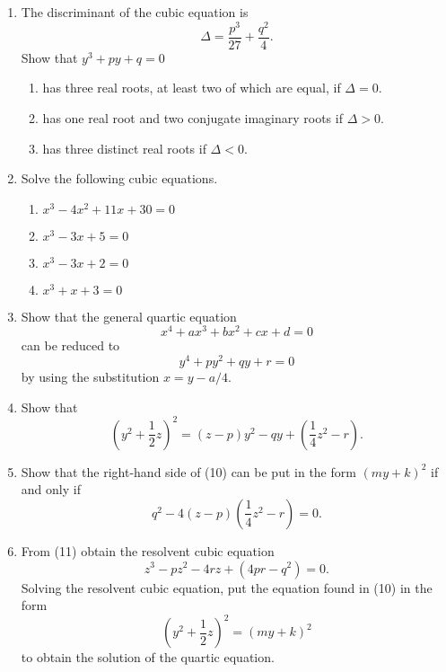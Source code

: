 {\begin{enumerate}
\item
The {\bfi discriminant\/} of the cubic equation is  
$$
\Delta = \frac{p^3}{27}  + \frac{q^2}{4}.
$$
Show that $y^3 + py + q=0$ 
\begin{enumerate}
 
\item
has three real roots, at least two of which are equal, if $\Delta = 0$.
 
\item
has one real root and two conjugate imaginary roots if $\Delta > 0$.
 
\item
has three distinct real roots if $\Delta < 0$.
 
\end{enumerate}

\item
Solve the following cubic equations.
\begin{multicols}{2}
\begin{enumerate}

\item 
$x^3 - 4x^2 + 11 x + 30 = 0$

\item 
$x^3 - 3x +5 = 0$

\item 
$x^3 - 3x +2 = 0$

\item 
$x^3 + x + 3 = 0$

\end{enumerate}

\end{multicols} 
 
\item
Show that the general quartic equation
$$
x^4 + ax^3 + bx^2 + cx + d =0
$$
can be reduced to
$$
y^4 + py^2 + qy + r = 0
$$
by using the substitution $x = y - a/4$.
 
 
\item
Show that
$$
\left(
y^2 + \frac{1}{2} z
\right)^2 =
(z - p)y^2 - qy + 
\left(
\frac{1}{4} z^2 - r
\right).
$$ 
 
\item
Show that the right-hand side of (10) can be put in the form $(my + k)^2$ if and only if
$$
q^2 - 4(z - p)\left(
\frac{1}{4} z^2 - r
\right) = 0.
$$
 
\item
From (11) obtain the {\bfi resolvent cubic equation}
$$
z^3 - pz^2 - 4rz + (4pr - q^2) = 0.
$$
Solving the resolvent cubic equation, put the equation found in (10) in the form
$$
\left(
y^2 + \frac{1}{2} z
\right)^2 
=
(my + k)^2
$$ 
to obtain the solution of the quartic equation.


\end{enumerate}}
